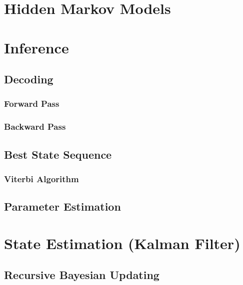 	\section{Hidden Markov Models} %

	\section{Inference} %

		\subsection{Decoding} %

			\subsubsection{Forward Pass} %

			\subsubsection{Backward Pass} %

		\subsection{Best State Sequence} %

			\subsubsection{Viterbi Algorithm} %

		\subsection{Parameter Estimation} %

	\section{State Estimation (Kalman Filter)} %

		\subsection{Recursive Bayesian Updating} %


